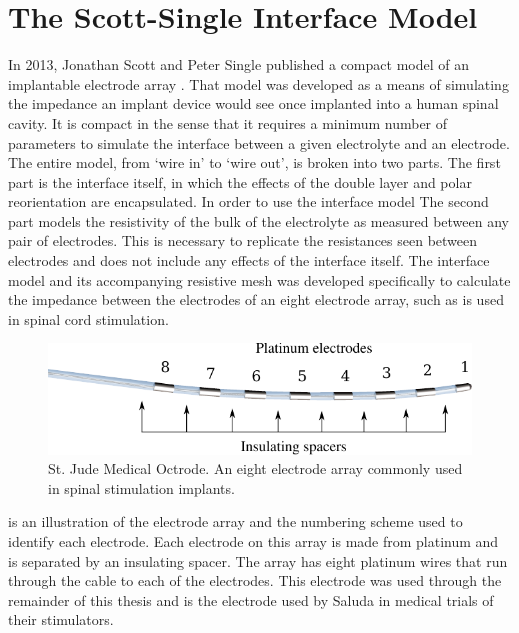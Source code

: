 
\section{The Scott-Single Interface Model}
  In 2013, Jonathan Scott and Peter Single published a compact model of an implantable electrode array \cite{ScottSingle2013}.
  That model was developed as a means of simulating the impedance an implant device would see once implanted into a human spinal cavity.
  It is compact in the sense that it requires a minimum number of parameters to simulate the interface between a given electrolyte and an electrode.
  The entire model, from `wire in' to `wire out', is broken into two parts.
  The first part is the interface itself, in which the effects of the double layer and polar reorientation are encapsulated.
  In order to use the interface model
  The second part models the resistivity of the bulk of the electrolyte as measured between any pair of electrodes.
  This is necessary to replicate the resistances seen between electrodes and does not include any effects of the interface itself.
  The interface model and its accompanying resistive mesh was developed specifically to calculate the impedance between the electrodes of an eight electrode array, such as is used in spinal cord stimulation.

  \begin{figure}
    \centering
    \includegraphics{content/pt2/07-InterfaceModel/graphics/StJudeOctrodeDiagram}
    \caption{\label{fig:StJudeOctrode_Labelled}St. Jude Medical Octrode. An eight electrode array commonly used in spinal stimulation implants.}
  \end{figure}

   is an illustration of the electrode array and the numbering scheme used to identify each electrode.
  Each electrode on this array is made from platinum and is separated by an insulating spacer.
  The array has eight platinum wires that run through the cable to each of the electrodes.
  This electrode was used through the remainder of this thesis and is the electrode used by Saluda in medical trials of their stimulators.

